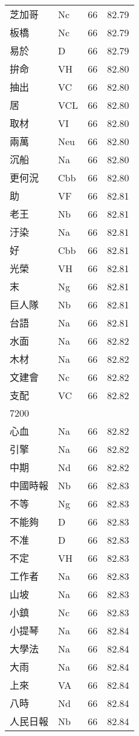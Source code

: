 \documentclass[twocolumn]{book}
\begin{document}
\begin{supertabular}{llrr}
芝加哥 & Nc & 66 &  82.79\\
板橋 & Nc & 66 &  82.79\\
易於 & D & 66 &  82.79\\
拚命 & VH & 66 &  82.80\\
抽出 & VC & 66 &  82.80\\
居 & VCL & 66 &  82.80\\
取材 & VI & 66 &  82.80\\
兩萬 & Neu & 66 &  82.80\\
沉船 & Na & 66 &  82.80\\
更何況 & Cbb & 66 &  82.80\\
助 & VF & 66 &  82.81\\
老王 & Nb & 66 &  82.81\\
汙染 & Na & 66 &  82.81\\
好 & Cbb & 66 &  82.81\\
光榮 & VH & 66 &  82.81\\
末 & Ng & 66 &  82.81\\
巨人隊 & Nb & 66 &  82.81\\
台語 & Na & 66 &  82.81\\
水面 & Na & 66 &  82.82\\
木材 & Na & 66 &  82.82\\
文建會 & Nc & 66 &  82.82\\
支配 & VC & 66 &  82.82\\
7200\\
心血 & Na & 66 &  82.82\\
引擎 & Na & 66 &  82.82\\
中期 & Nd & 66 &  82.82\\
中國時報 & Nb & 66 &  82.83\\
不等 & Ng & 66 &  82.83\\
不能夠 & D & 66 &  82.83\\
不准 & D & 66 &  82.83\\
不定 & VH & 66 &  82.83\\
工作者 & Na & 66 &  82.83\\
山坡 & Na & 66 &  82.83\\
小鎮 & Nc & 66 &  82.83\\
小提琴 & Na & 66 &  82.84\\
大學法 & Na & 66 &  82.84\\
大雨 & Na & 66 &  82.84\\
上來 & VA & 66 &  82.84\\
八時 & Nd & 66 &  82.84\\
人民日報 & Nb & 66 &  82.84\\

\end{supertabular}
\end{document}
